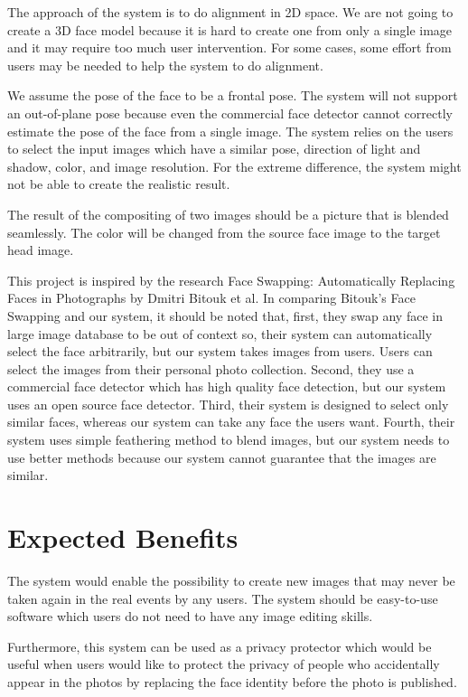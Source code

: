The approach of the system is to do alignment in 2D space. We are not going to create a 3D face model because it is hard to create one from only a single image and it may require too much user intervention. For some cases, some effort from users may be needed to help the system to do alignment.

We assume the pose of the face to be a frontal pose. The system will not support an out-of-plane pose because even the commercial face detector cannot correctly estimate the pose of the face from a single image. The system relies on the users to select the input images which have a similar pose, direction of light and shadow, color, and image resolution. For the extreme difference, the system might not be able to create the realistic result.

The result of the compositing of two images should be a picture that is blended seamlessly. The color will be changed from the source face image to the target head image.

This project is inspired by the research Face Swapping: Automatically Replacing Faces in Photographs by Dmitri Bitouk et al. In comparing Bitouk's Face Swapping and our system, it should be noted that, first, they swap any face in large image database to be out of context so, their system can automatically select the face arbitrarily, but our system takes images from users. Users can select the images from their personal photo collection. Second, they use a commercial face detector which has high quality face detection, but our system uses an open source face detector. Third, their system is designed to select only similar faces, whereas our system can take any face the users want. Fourth, their system uses simple feathering method to blend images, but our system needs to use better methods because our system cannot guarantee that the images are similar.


\section{Expected Benefits}
\hspace{0.5in}The system would enable the possibility to create new images that may never be taken again in the real events by any users. The system should be easy-to-use software which users do not need to have any image editing skills.

Furthermore, this system can be used as a privacy protector which would be useful when users would like to protect the privacy of people who accidentally appear in the photos by replacing the face identity before the photo is published.


